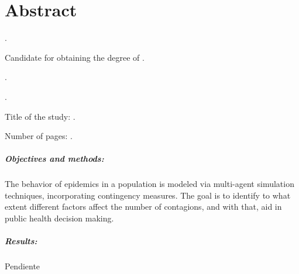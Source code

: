 
\chapter{Abstract}

{\setlength{\leftskip}{10mm}
\setlength{\parindent}{-10mm}

\autoren.

Candidate for obtaining the degree of \gradoen\orientacionen.

\uanl.

\fime.

Title of the study: \textsc{\tituloen}.

\noindent Number of pages: \pageref*{lastpage}.}

\paragraph{Objectives and methods:}
The behavior of epidemics in a population is modeled via multi-agent simulation techniques, incorporating contingency measures. The goal is to identify to what extent different factors affect the number of contagions, and with that, aid in public health decision making.


\paragraph{Results:}
Pendiente


